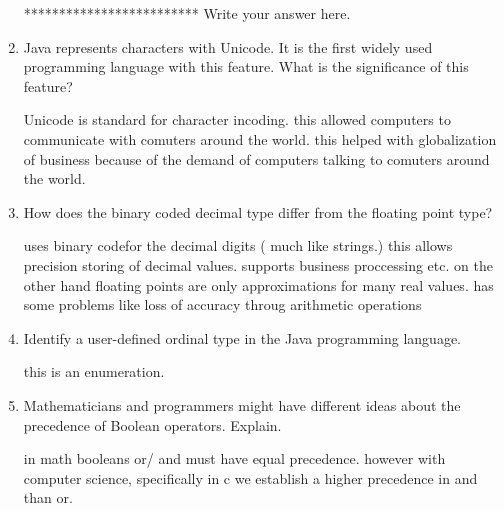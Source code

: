 \begin{enumerate}
\begin{answer}
   ************************* Write your answer here.

    \end{answer}

  \item Java represents characters with Unicode. It is the first
    widely used programming language with this feature. What is the
    significance of this feature?

  \begin{answer}

  Unicode is standard for character incoding. this allowed computers
  to communicate with comuters around the world. this helped with
  globalization of business because of the demand of computers talking
  to comuters around the world.

    \end{answer}

  \item How does the binary coded decimal type differ from the
    floating point type?

  \begin{answer}

  uses binary codefor the decimal digits ( much like strings.) this
  allows precision storing of decimal values. supports business
  proccessing etc.  on the other hand floating points are only
  approximations for many real values. has some problems like loss of
  accuracy throug arithmetic operations

    \end{answer}

  \item Identify a user-defined ordinal type in the Java programming
    language.

  \begin{answer}

   this is an enumeration. 

    \end{answer}

  \item Mathematicians and programmers might have different ideas
    about the precedence of Boolean operators. Explain.

  \begin{answer}

   in math booleans or/ and must have equal precedence.  however with
   computer science, specifically in c we establish a higher
   precedence in and than or.

    \end{answer}


\end{enumerate}
